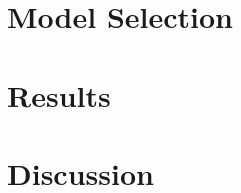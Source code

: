 \documentclass[12pt]{article}  %
\theoremstyle{definition}
\theoremstyle{remark}
\begin{document}
\section{Model Selection}

\section{Results}

\section{Discussion}




\end{document}

